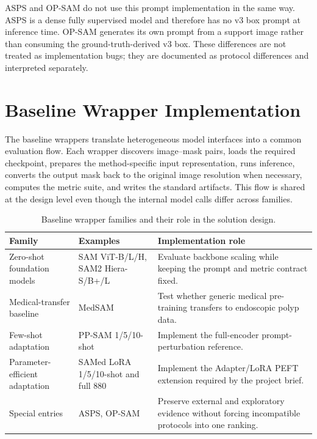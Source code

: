 ASPS and OP-SAM do not use this prompt implementation in the same way. ASPS is a dense fully supervised model and therefore has no v3 box prompt at inference time. OP-SAM generates its own prompt from a support image rather than consuming the ground-truth-derived v3 box. These differences are not treated as implementation bugs; they are documented as protocol differences and interpreted separately.

\section{Baseline Wrapper Implementation}
\label{sec:baseline-wrapper-implementation}

The baseline wrappers translate heterogeneous model interfaces into a common evaluation flow. Each wrapper discovers image--mask pairs, loads the required checkpoint, prepares the method-specific input representation, runs inference, converts the output mask back to the original image resolution when necessary, computes the metric suite, and writes the standard artifacts. This flow is shared at the design level even though the internal model calls differ across families.

\begin{table}[H]
\centering
\caption{Baseline wrapper families and their role in the solution design.}
\label{tab:baseline-wrapper-roles}
\begin{tabular}{p{3.4cm}p{3.8cm}p{6.0cm}}
\toprule
\textbf{Family} & \textbf{Examples} & \textbf{Implementation role} \\
\midrule
Zero-shot foundation models & SAM ViT-B/L/H, SAM2 Hiera-S/B+/L & Evaluate backbone scaling while keeping the prompt and metric contract fixed. \\
Medical-transfer baseline & MedSAM & Test whether generic medical pre-training transfers to endoscopic polyp data. \\
Few-shot adaptation & PP-SAM 1/5/10-shot & Implement the full-encoder prompt-perturbation reference. \\
Parameter-efficient adaptation & SAMed LoRA 1/5/10-shot and full 880 & Implement the Adapter/LoRA PEFT extension required by the project brief. \\
Special entries & ASPS, OP-SAM & Preserve external and exploratory evidence without forcing incompatible protocols into one ranking. \\
\bottomrule
\end{tabular}
\end{table}

